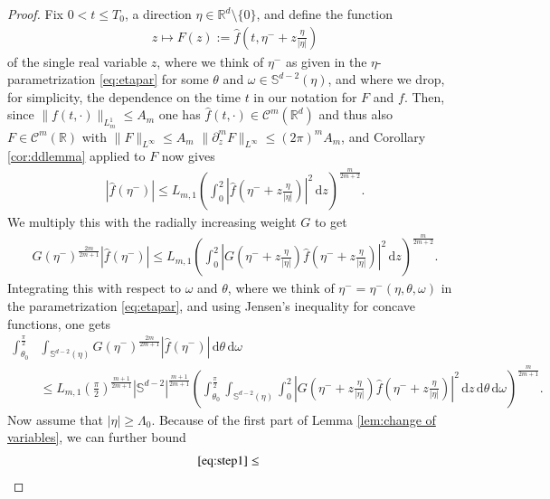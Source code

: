 \documentclass[11pt,a4paper,reqno]{amsart}
\theoremstyle{plain}
\theoremstyle{definition}
\begin{document}
\begin{proof}
 	Fix $0<t\le T_0$, a direction $\eta\in {\mathbb{R}}^d\setminus\{0\}$, and define the function
	\begin{align*}
		z\mapsto F(z):= \hat{f}(t,\eta^- + z\tfrac{\eta}{|\eta|})
	\end{align*}
	of the single real variable $z$, where we think of $\eta^-$ as given in the $\eta$-parametrization \eqref{eq:etapar} for some $\theta$ and $\omega\in {\mathbb{S}}^{d-2}(\eta)$, and where we drop, for simplicity, the dependence on the time $t$ in our notation for $F$ and $f$.
	Then, since $\|f(t,\cdot)\|_{L^1_m}\le A_m$ one has $\hat{f}(t,\cdot)\in \mathcal{C}^m({\mathbb{R}}^d)$  and thus also  $F\in \mathcal{C}^m({\mathbb{R}})$ with $\|F\|_{L^{\infty}} \leq A_m$ $\|\partial^m_z F\|_{L^{\infty}} \leq (2\pi)^m A_m$,  and Corollary \ref{cor:ddlemma} applied to $F$ now gives
	\begin{align*}
		|\hat{f}(\eta^-)| \le L_{m,1} \left( \int_0^2|\hat{f}(\eta^- + z\tfrac{\eta}{|\eta|})|^2\, \mathrm{d}z\right)^{\frac{m}{2m+2}} .
	\end{align*}
	We multiply  this with the radially increasing weight $G$ to get
	\begin{align*}
		G(\eta^-)^{\frac{2m}{2m+1}} |\hat{f}(\eta^-)|
		\leq
		  L_{m,1} \left( \int_0^2|G(\eta^- +z\tfrac{\eta}{|\eta|})\hat{f}(\eta^- + z\tfrac{\eta}{|\eta|})|^2\, \mathrm{d}z\right)^{\frac{m}{2m+2}} .
	\end{align*}
	Integrating this with respect to $\omega$ and $\theta$, where we think of $\eta^-= \eta^-(\eta,\theta,\omega)$ in the parametrization \eqref{eq:etapar}, and using Jensen's inequality for concave functions, one gets
	\begin{align}
		\int_{\theta_0}^{\tfrac{\pi}{2}} &\int_{{\mathbb{S}}^{d-2}(\eta)}  G(\eta^-)^{\frac{2m}{2m+1}} |\hat{f}(\eta^-)| \, \mathrm{d}\theta\, \mathrm{d}\omega \nonumber \\
		& \leq
		 L_{m,1} (\tfrac{\pi}{2})^{\frac{m+1}{2m+1}} |{\mathbb{S}}^{d-2}|^{\frac{m+1}{2m+1}}
		 \left( \int_{\theta_0}^{\tfrac{\pi}{2}} \int_{{\mathbb{S}}^{d-2}(\eta)} \int_0^2|G(\eta^- +z\tfrac{\eta}{|\eta|})\hat{f}(\eta^- + z\tfrac{\eta}{|\eta|})|^2\,
		 \mathrm{d}z \, \mathrm{d}\theta\, \mathrm{d}\omega \right)^{\frac{m}{2m+1}}
		 \label{eq:step1} .
	\end{align}
	Now assume that $|\eta|\ge \Lambda_0$. Because of the first part of Lemma \ref{lem:change of variables}, we can further bound
	\begin{align*}
		\eqref{eq:step1} &\le

\end{align*}
\end{proof}
\end{document}
